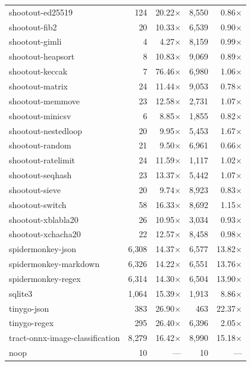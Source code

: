 \begin{longtable}{l r r r r}
shootout-ed25519 & 124 & 20.22$\times$ & 8{,}550 & 0.86$\times$ \\
shootout-fib2 & 20 & 10.33$\times$ & 6{,}539 & 0.90$\times$ \\
shootout-gimli & 4 & 4.27$\times$ & 8{,}159 & 0.99$\times$ \\
shootout-heapsort & 8 & 10.83$\times$ & 9{,}069 & 0.89$\times$ \\
shootout-keccak & 7 & 76.46$\times$ & 6{,}980 & 1.06$\times$ \\
shootout-matrix & 24 & 11.44$\times$ & 9{,}053 & 0.78$\times$ \\
shootout-memmove & 23 & 12.58$\times$ & 2{,}731 & 1.07$\times$ \\
shootout-minicsv & 6 & 8.85$\times$ & 1{,}855 & 0.82$\times$ \\
shootout-nestedloop & 20 & 9.95$\times$ & 5{,}453 & 1.67$\times$ \\
shootout-random & 21 & 9.50$\times$ & 6{,}961 & 0.66$\times$ \\
shootout-ratelimit & 24 & 11.59$\times$ & 1{,}117 & 1.02$\times$ \\
shootout-seqhash & 23 & 13.37$\times$ & 5{,}442 & 1.07$\times$ \\
shootout-sieve & 20 & 9.74$\times$ & 8{,}923 & 0.83$\times$ \\
shootout-switch & 58 & 16.33$\times$ & 8{,}692 & 1.15$\times$ \\
shootout-xblabla20 & 26 & 10.95$\times$ & 3{,}034 & 0.93$\times$ \\
shootout-xchacha20 & 22 & 12.57$\times$ & 8{,}458 & 0.98$\times$ \\
spidermonkey-json & 6{,}308 & 14.37$\times$ & 6{,}577 & 13.82$\times$ \\
spidermonkey-markdown & 6{,}326 & 14.22$\times$ & 6{,}551 & 13.76$\times$ \\
spidermonkey-regex & 6{,}314 & 14.30$\times$ & 6{,}504 & 13.90$\times$ \\
sqlite3 & 1{,}064 & 15.39$\times$ & 1{,}913 & 8.86$\times$ \\
tinygo-json & 383 & 26.90$\times$ & 463 & 22.37$\times$ \\
tinygo-regex & 295 & 26.40$\times$ & 6{,}396 & 2.05$\times$ \\
tract-onnx-image-classification & 8{,}279 & 16.42$\times$ & 8{,}990 & 15.18$\times$ \\
noop & 10 & --- & 10 & --- \\
\end{longtable}

